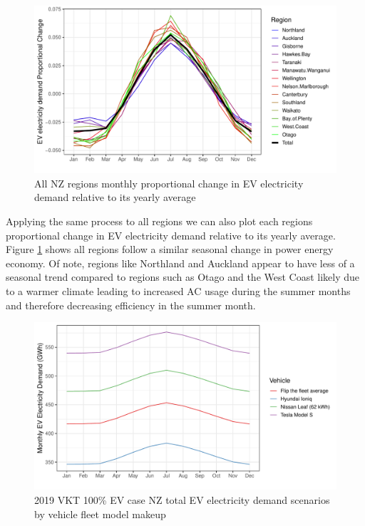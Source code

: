 \documentclass[
]{article}
\begin{document}
\begin{figure}
\centering
\includegraphics{final_report_files/figure-latex/NZ_region_power_prop-1.pdf}
\caption{All NZ regions monthly proportional change in EV electricity
demand relative to its yearly average\label{fig:NZ_region_power_prop}}
\end{figure}

Applying the same process to all regions we can also plot each regions
proportional change in EV electricity demand relative to its yearly
average. Figure \ref{fig:NZ_region_power_prop} shows all regions follow
a similar seasonal change in power energy economy. Of note, regions like
Northland and Auckland appear to have less of a seasonal trend compared
to regions such as Otago and the West Coast likely due to a warmer
climate leading to increased AC usage during the summer months and
therefore decreasing efficiency in the summer month.

\begin{figure}
\centering
\includegraphics{final_report_files/figure-latex/vehicle_power_usage-1.pdf}
\caption{2019 VKT 100\% EV case NZ total EV electricity demand scenarios
by vehicle fleet model makeup\label{fig:vehicle_power_usage}}
\end{figure}
\end{document}
